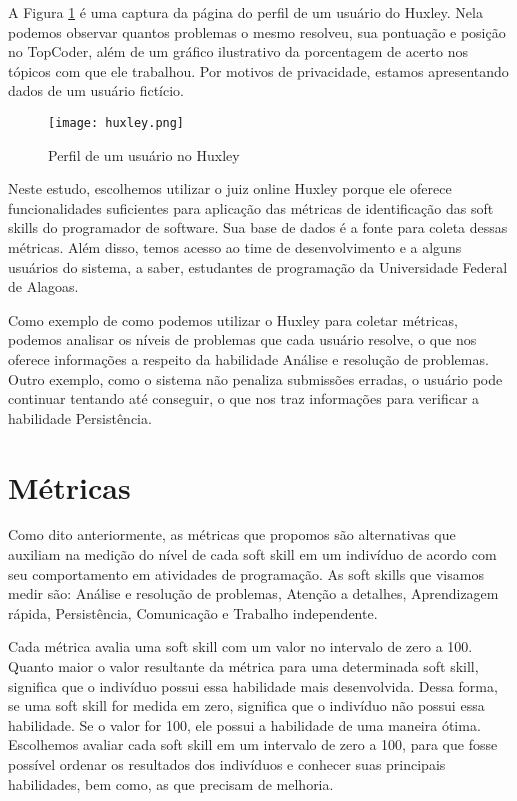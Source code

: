 A Figura \ref{fig:huxley} é uma captura da página do perfil de um usuário do Huxley. Nela podemos observar quantos problemas o mesmo resolveu, sua pontuação e posição no TopCoder, além de um gráfico ilustrativo da porcentagem de acerto nos tópicos com que ele trabalhou.
Por motivos de privacidade, estamos apresentando dados de um usuário fictício.

\begin{figure}[ht]
\centering
\caption{\small Perfil de um usuário no Huxley} 
\texttt{[image: huxley.png]}
\label{fig:huxley}
\end{figure}

Neste estudo, escolhemos utilizar o juiz online Huxley porque ele oferece funcionalidades suficientes para aplicação das métricas de identificação das soft skills do programador de software. Sua base de dados é a fonte para coleta dessas métricas. Além disso, temos acesso ao time de desenvolvimento e a alguns usuários do sistema, a saber, estudantes de programação da Universidade Federal de Alagoas.

Como exemplo de como podemos utilizar o Huxley para coletar métricas, podemos analisar os níveis de problemas que cada usuário resolve, o que nos oferece informações a respeito da habilidade Análise e resolução de problemas. Outro exemplo, como o sistema não penaliza submissões erradas, o usuário pode continuar tentando até conseguir, o que nos traz informações para verificar a habilidade Persistência.

\section{Métricas} 
\label{sec:metrics}

Como dito anteriormente, as métricas que propomos são alternativas que auxiliam na medição do nível de cada soft skill em um indivíduo de acordo com seu comportamento em atividades de programação. As soft skills que visamos medir são: Análise e resolução de problemas, Atenção a detalhes, Aprendizagem rápida, Persistência, Comunicação e Trabalho independente.

Cada métrica avalia uma soft skill com um valor no intervalo de zero a 100. Quanto maior o valor resultante da métrica para uma determinada soft skill, significa que o indivíduo possui essa habilidade mais desenvolvida. Dessa forma, se uma soft skill for medida em zero, significa que o indivíduo não possui essa habilidade. Se o valor for 100, ele possui a habilidade de uma maneira ótima. Escolhemos avaliar cada soft skill em um intervalo de zero a 100, para que fosse possível ordenar os resultados dos indivíduos e conhecer suas principais habilidades, bem como, as que precisam de melhoria.

